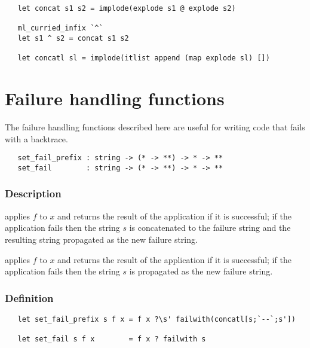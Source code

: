 \begin{hol}\begin{verbatim}
   let concat s1 s2 = implode(explode s1 @ explode s2)

   ml_curried_infix `^`
   let s1 ^ s2 = concat s1 s2

   let concatl sl = implode(itlist append (map explode sl) [])
\end{verbatim}\end{hol}


\section{Failure handling functions}

The failure
 handling functions described here are useful for writing code that
fails with a backtrace.

\begin{boxed}
\begin{verbatim}
   set_fail_prefix : string -> (* -> **) -> * -> **
   set_fail        : string -> (* -> **) -> * -> **
\end{verbatim}\end{boxed}

\subsubsection*{Description}

 applies $f$ to $x$ and returns the
result of the application if it is successful; if the application fails then
the string $s$ is concatenated to the failure string and the resulting string
propagated as the new failure string.

\noindent
{} applies $f$ to $x$ and returns the result of
the application if it is successful; if the application fails then the string
$s$ is propagated as the new failure string.

\subsubsection*{Definition}

\begin{hol}\begin{verbatim}
   let set_fail_prefix s f x = f x ?\s' failwith(concatl[s;`--`;s'])

   let set_fail s f x        = f x ? failwith s
\end{verbatim}\end{hol}

